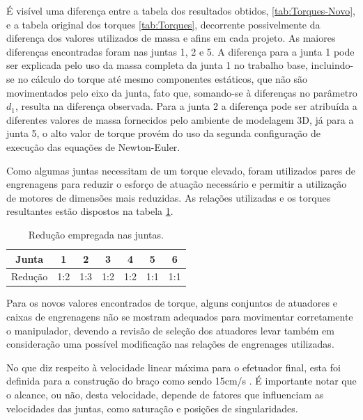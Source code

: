 É visível uma diferença entre a tabela dos resultados obtidos, \ref{tab:Torques-Novo}, e a tabela original dos torques 
\ref{tab:Torques}, decorrente possivelmente da diferença dos valores utilizados de massa e 
afins em cada projeto. As maiores diferenças encontradas foram nas juntas 1, 2 e 5. A diferença para a 
junta 1 pode ser explicada pelo uso da massa completa da junta 1 no trabalho base, incluindo-se no cálculo
do torque até mesmo componentes estáticos, que não são movimentados pelo eixo da junta, fato que, somando-se à 
diferenças no parâmetro $d_1$, resulta na diferença observada. Para a junta 2
a diferença pode ser atribuída a diferentes valores de massa fornecidos pelo ambiente de
modelagem 3D, já para a junta 5, o alto valor de torque provém do uso da segunda configuração de 
execução das equações de Newton-Euler.

Como algumas juntas necessitam de um torque elevado, foram utilizados pares de 
engrenagens para reduzir o esforço de atuação necessário e permitir a utilização
de motores de dimensões mais reduzidas. As relações utilizadas e os torques 
resultantes estão dispostos na tabela \ref{tab:TorquesReducao}. 

\begin{table}[h]
\begin{centering}    
    
\begin{tabular}{|c|c|c|c|c|c|c|}
    \hline
    Junta & 1 & 2 & 3 & 4 & 5 & 6 \tabularnewline
    \hline
    Redução & 1:2 & 1:3 & 1:2 & 1:2 & 1:1 & 1:1 \tabularnewline
    \hline
\end{tabular}

\caption{Redução empregada nas juntas.}
\label{tab:TorquesReducao}

\par\end{centering}
\end{table}

Para os novos valores encontrados de torque, alguns conjuntos de atuadores
e caixas de engrenagens não se mostram adequados para movimentar corretamente
o manipulador, devendo a revisão de seleção dos atuadores levar também em 
consideração uma possível modificação nas relações de engrenages utilizadas.

No que diz respeito à velocidade linear máxima para o efetuador final, 
esta foi definida para a construção do braço como sendo 15cm/s \cite{fernando2019assistivo}.
É importante notar que o alcance, ou não, desta velocidade, depende de 
fatores que influenciam as velocidades das juntas, como saturação e
posições de singularidades.

